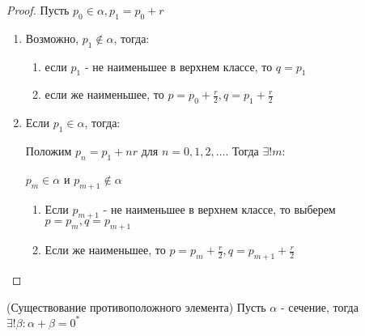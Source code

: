 \begin{proof}
    Пусть $p_0 \in \alpha, p_1 = p_0 + r$

    \begin{enumerate}
        \item Возможно, $p_1 \notin \alpha$, тогда:
        
        \begin{enumerate}
            \item если $p_1$ - не наименьшее в верхнем классе, то $q = p_1$
            \item если же наименьшее, то $p = p_0 + \frac{r}{2}, q = p_1 + \frac{r}{2}$
        \end{enumerate}
        \item Если $p_1 \in \alpha$, тогда:
        
        Положим $p_n = p_1 + nr$ для $n = 0, 1, 2, \ldots$. Тогда $\exists! m$: 
        
        $p_m \in \alpha$ и $p_{m+1} \notin \alpha$

        \begin{enumerate}
            \item Если $p_{m+1}$ - не наименьшее в верхнем классе, то выберем $p = p_m, q = p_{m+1}$
            \item Если же наименьшее, то $p = p_m + \frac{r}{2}, q = p_{m+1} + \frac{r}{2}$
        \end{enumerate}
    \end{enumerate}
\end{proof}

\begin{theorem} (Существование противоположного элемента)
    \label{existence_of_opposite_section}
    Пусть $\alpha$ - сечение, тогда $\exists! \beta: \alpha + \beta = 0^*$
\end{theorem}

